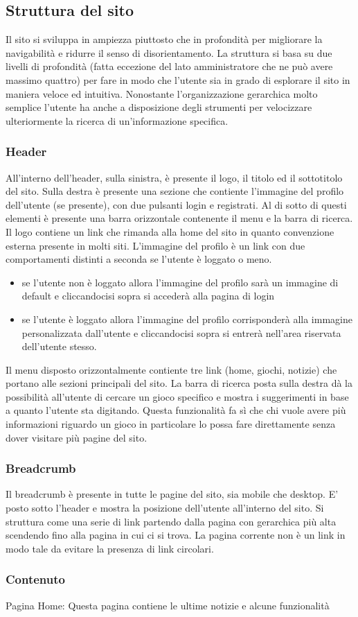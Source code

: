 \subsection{Struttura del sito}

Il sito si sviluppa in ampiezza piuttosto che in profondità per migliorare la navigabilità e ridurre il senso di disorientamento. La struttura si basa su due livelli di profondità (fatta eccezione del lato amministratore che ne può avere massimo quattro) per fare in modo che l'utente sia in grado di esplorare il sito in maniera veloce ed intuitiva. Nonostante l'organizzazione gerarchica molto semplice l'utente ha anche a disposizione degli strumenti per velocizzare ulteriormente la ricerca di un'informazione specifica.

\subsubsection{Header}
All'interno dell'header, sulla sinistra, è presente il logo, il titolo ed il sottotitolo del sito. Sulla destra è presente una sezione che contiente l'immagine del profilo dell'utente (se presente), con due pulsanti login e registrati. Al di sotto di questi elementi è presente una barra orizzontale contenente il menu e la barra di ricerca.
Il logo contiene un link che rimanda alla home del sito in quanto convenzione esterna presente in molti siti.
L'immagine del profilo è un link con due comportamenti distinti a seconda se l'utente è loggato o meno.
\begin{itemize}
	\item se l'utente non è loggato allora l'immagine del profilo sarà un immagine di default e cliccandocisi sopra si accederà alla pagina di login
	\item se l'utente è loggato allora l'immagine del profilo corrisponderà alla immagine personalizzata dall'utente e cliccandocisi sopra si entrerà nell'area riservata dell'utente stesso.   
\end{itemize}


Il menu disposto orizzontalmente contiente tre link (home, giochi, notizie) che portano alle sezioni principali del sito.
La barra di ricerca posta sulla destra dà la possibilità all'utente di cercare un gioco specifico e mostra i suggerimenti in base a quanto l'utente sta digitando. Questa funzionalità fa sì che chi vuole avere più informazioni riguardo un gioco in particolare lo possa fare direttamente senza dover visitare più pagine del sito.

\subsubsection{Breadcrumb}
Il breadcrumb è presente in tutte le pagine del sito, sia mobile che desktop.
E' posto sotto l'header e mostra la posizione dell'utente all'interno del sito. Si struttura come una serie di link partendo dalla pagina con gerarchica più alta scendendo fino alla pagina in cui ci si trova. La pagina corrente non è un link in modo tale da evitare la presenza di link circolari.

\subsubsection{Contenuto}
Pagina Home: Questa pagina contiene le ultime notizie e alcune funzionalità
